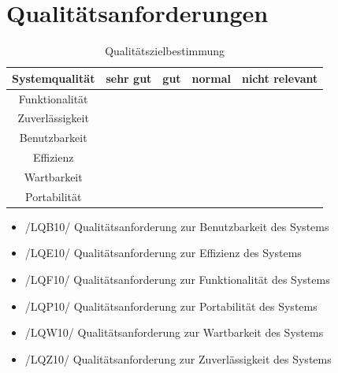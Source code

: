 \documentclass[12pt, a4paper]{article}
\begin{document}
\section{Qualitätsanforderungen}
\newcommand{\xmark}{\ding{55}}%
\begin{table}[h]
	\centering
\begin{tabular}{ || c | c | c | c | c || }
	\hline
	Systemqualität & sehr gut & gut & normal & nicht relevant  \\ \hline
	Funktionalität &  & \xmark &  &  \\ \hline
	Zuverlässigkeit &  & \xmark &  &  \\ \hline
	Benutzbarkeit &  & \xmark &  &  \\ \hline
	Effizienz &  & \xmark &  &  \\ \hline
	Wartbarkeit &  &  & \xmark &  \\ \hline
	Portabilität &  &  &  & \xmark \\ 
	\hline	
\end{tabular}
\caption{Qualitätszielbestimmung}
\label{table:qualitätsanforderungen}
\end{table}
\begin{itemize}
	\item /LQB10/ Qualitätsanforderung zur Benutzbarkeit des Systems
	\item /LQE10/ Qualitätsanforderung zur Effizienz des Systems
	\item /LQF10/ Qualitätsanforderung zur Funktionalität des Systems
	\item /LQP10/ Qualitätsanforderung zur Portabilität des Systems
	\item /LQW10/ Qualitätsanforderung zur Wartbarkeit des Systems
	\item /LQZ10/ Qualitätsanforderung zur Zuverlässigkeit des Systems
\end{itemize}
\end{document}
